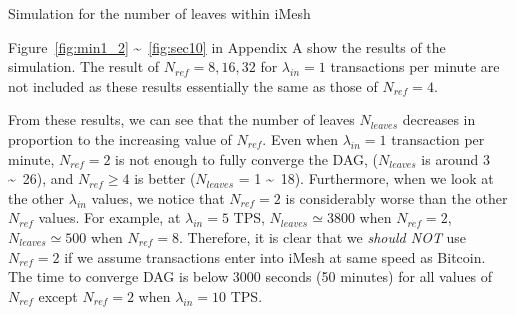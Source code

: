 \documentclass[a4paper,10pt,twocolumn]{article}
\begin{document}
	\begin{algorithm}[ht]                  
		\caption{Simulation for the number of leaves within iMesh}         
		\label{alg:sim1}
		\begin{algorithmic}
			\STATE{}
	
		\STATE{}
	
	\STATE{}
	\ENDFOR{}
	\ENDIF{}
	\ENDFOR{}
	\ENDWHILE{}
	\end{algorithmic}
		\end{algorithm}

	Figure~\ref{fig:min1_2} \textasciitilde~\ref{fig:sec10} in Appendix A show the results of the simulation.
	 The result of \( N_{ref}=8,16,32\) for \( \lambda_{in}=1\) transactions per minute are not included
	 as these results essentially the same as those of \( N_{ref}=4\).

	 From these results, we can see that the number of leaves \( N_{leaves}\) decreases in proportion to the increasing value of \( N_{ref} \).
	 Even when \( \lambda_{in}=1\) transaction per minute, \( N_{ref}=2\) is not enough to fully converge the DAG, (\( N_{leaves}\) is around 3 \textasciitilde~26),
	 and \( N_{ref} \ge 4\)  is better (\( N_{leaves}\) = 1 \textasciitilde~18).
	 Furthermore, when we look at the other \( \lambda_{in}\) values, we notice that \( N_{ref}=2\) is considerably worse than the other \( N_{ref}\) values.
	 For example, at \( \lambda_{in}=5\) TPS,  \( N_{leaves} \simeq 3800 \) when \( N_{ref}=2\),
	\( N_{leaves} \simeq 500\)  when \( N_{ref}=8\). Therefore, it is clear that we \emph{should NOT} use \( N_{ref}=2\) if we assume 
	transactions enter into iMesh at same speed as Bitcoin.
	The time to converge DAG is below 3000 seconds (50 minutes) for all values of \( N_{ref} \) except \( N_{ref}=2\) when \( \lambda_{in}=10\) TPS\@.
	
\end{document}
